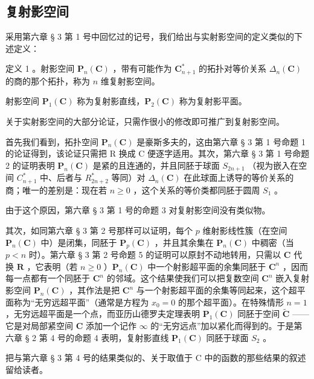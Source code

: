 \subsection{复射影空间}

采用第六章 § 3 第 1 号中回忆过的记号，我们给出与实射影空间的定义类似的下述定义：

定义 1 。射影空间 \(\mathbf{P}_{n}(\mathbf{C})\) ，带有可能作为 \(\mathbf{C}_{n+1}^{*}\) 的拓扑对等价关系 \(\Delta_{n}(\mathbf{C})\) 的商的那个拓扑，称为 \(n\) 维复射影空间。

射影空间 \(\mathbf{P}_{1}(\mathbf{C})\) 称为复射影直线，\(\mathbf{P}_{2}(\mathbf{C})\) 称为复射影平面。

关于实射影空间的大部分论证，只需作很小的修改即可推广到复射影空间。

首先我们看到，拓扑空间 \(\mathbf{P}_{n}(\mathbf{C})\) 是豪斯多夫的，这由第六章 § 3 第 1 号命题 1 的论证得到，该论证只需把 R 换成 C 便逐字适用。其次，第六章 § 3 第 1 号命题 2 的证明表明 \(\mathbf{P}_{n}(\mathbf{C})\) 是紧的且连通的，并且同胚于球面 \(S_{2n+1}\) （视为嵌入在空间 \(C_{n+1}^{*}\) 中、后者与 \(R_{2n+2}^{*}\) 等同）对 \(\Delta_{n}(\mathbf{C})\) 在此球面上诱导的等价关系的商；唯一的差别是：现在若 \(n \geqslant 0\) ，这个关系的等价类都同胚于圆周 \(S_{1}\) 。

由于这个原因，第六章 § 3 第 1 号的命题 3 对复射影空间没有类似物。

其次，如同第六章 § 3 第 2 号那样可以证明，每个 \(p\) 维射影线性簇（在空间 \(\mathbf{P}_n(\mathbf{C})\) 中）是闭集，同胚于 \(\mathbf{P}_p(\mathbf{C})\) ，并且其余集在 \(\mathbf{P}_n(\mathbf{C})\) 中稠密（当 \(p < n\) 时）。第六章 § 3 第 2 号命题 5 的证明可以原封不动地转用，只需以 \(\mathbf{C}\) 代换 \(\mathbf{R}\) ，它表明（若 \(n \geqslant 0\) ）\(\mathbf{P}_n(\mathbf{C})\) 中一个射影超平面的余集同胚于 \(\mathbf{C}^n\) ，因而每一点都有一个同胚于 \(\mathbf{C}^n\) 的邻域。这个结果使我们可以把复数空间 \(\mathbf{C}^n\) 嵌入复射影空间 \(\mathbf{P}_n(\mathbf{C})\) ，其作法是把 \(\mathbf{C}^n\) 与一个射影超平面的余集等同起来，这个超平面称为“无穷远超平面”（通常是方程为 \(x_0 = 0\) 的那个超平面）。在特殊情形 \(n = 1\) ，无穷远超平面是一个点，而亚历山德罗夫定理表明 \(\mathbf{P}_1(\mathbf{C})\) 同胚于空间 \(\tilde{\mathbf{C}}\) ——它是对局部紧空间 \(\mathbf{C}\) 添加一个记作 \(\infty\) 的“无穷远点”加以紧化而得到的。于是第六章 § 2 第 4 号的命题 4 表明，复射影直线 \(\mathbf{P}_1(\mathbf{C})\) 同胚于球面 \(S_2\) 。

把与第六章 § 3 第 4 号的结果类似的、关于取值于 C 中的函数的那些结果的叙述留给读者。

